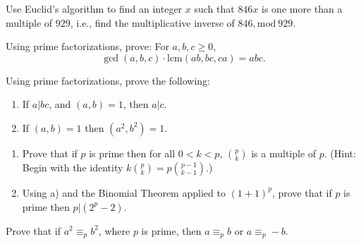 \documentclass[12pt,letterpaper]{hmcpset}
\renewcommand{\c}[2]{\binom{#1}{#2}}
\renewcommand{\t}[1]{\text{#1}}
\begin{document}

\begin{problem}[1]
    Use Euclid's algorithm to find an integer $x$ such that $846x$ is one more than a multiple of $929$, i.e., find the multiplicative inverse of $846,\t{mod}~929$.
\end{problem}
\begin{solution}
    \vfill
\end{solution}
\newpage

\begin{problem}[2]
    Using prime factorizations, prove: For $a,b,c\geq0$,
    \[
        \gcd(a,b,c)\cdot\t{lcm}(ab,bc,ca)=abc.
    \]
\end{problem}
\begin{solution}
    \vfill
\end{solution}
\newpage

\begin{problem}[3]
    Using prime factorizations, prove the following:
    \begin{enumerate}
        \item If $a|bc$, and $(a,b)=1$, then $a|c$.
        \item If $(a,b)=1$ then $(a^2,b^2)=1$.
    \end{enumerate}
\end{problem}
\begin{solution}
    \vfill
\end{solution}
\newpage

\begin{problem}[4]
    \begin{enumerate}
        \item Prove that if $p$ is prime then for all $0<k<p$, $\c{p}{k}$ is a multiple of $p$. (Hint: Begin with the identity $k\c{p}{k}=p\c{p-1}{k-1}.$)
        \item Using a) and the Binomial Theorem applied to $(1+1)^p$, prove that if $p$ is prime then $p|(2^p-2)$.
    \end{enumerate}
\end{problem}
\begin{solution}
    \vfill
\end{solution}
\newpage

\begin{problem}[5]
    Prove that if $a^2\equiv_pb^2$, where $p$ is prime, then $a\equiv_pb$ or $a\equiv_p-b$.
\end{problem}
\begin{solution}
    \vfill
\end{solution}
\newpage
\end{document}

